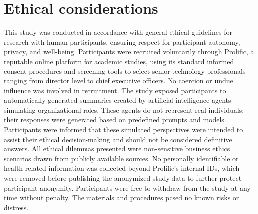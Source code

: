 \section{Ethical considerations}

This study was conducted in accordance with general ethical guidelines for research with human participants, ensuring respect for participant autonomy, privacy, and well-being.
Participants were recruited voluntarily through Prolific, a reputable online platform for academic studies, using its standard informed consent procedures and screening tools to select senior technology professionals ranging from director level to chief executive officers. No coercion or undue influence was involved in recruitment.
The study exposed participants to automatically generated summaries created by artificial intelligence agents simulating organizational roles. These agents do not represent real individuals; their responses were generated based on predefined prompts and models. Participants were informed that these simulated perspectives were intended to assist their ethical decision-making and should not be considered definitive answers.
All ethical dilemmas presented were non-sensitive business ethics scenarios drawn from publicly available sources.
No personally identifiable or health-related information was collected beyond Prolific's internal IDs, which were removed before publishing the anonymized study data to further protect participant anonymity.
Participants were free to withdraw from the study at any time without penalty. The materials and procedures posed no known risks or distress.
